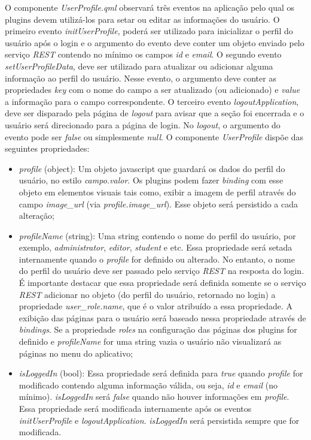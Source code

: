 O componente \textit{UserProfile.qml} observará três eventos na aplicação pelo qual os plugins devem utilizá-los para setar ou editar as informações do usuário. O primeiro evento \textit{initUserProfile}, poderá ser utilizado para inicializar o perfil do usuário após o login e o argumento do evento deve conter um objeto enviado pelo serviço \textit{REST} contendo no mínimo os campos \textit{id} e \textit{email}. O segundo evento \textit{setUserProfileData}, deve ser utilizado para atualizar ou adicionar alguma informação ao perfil do usuário. Nesse evento, o argumento deve conter as propriedades \textit{key} com o nome do campo a ser atualizado (ou adicionado) e \textit{value} a informação para o campo correspondente. O terceiro evento \textit{logoutApplication}, deve ser disparado pela página de \textit{logout} para avisar que a seção foi encerrada e o usuário será direcionado para a página de login. No \textit{logout}, o argumento do evento pode ser \textit{false} ou simplesmente \textit{null}. O componente \textit{UserProfile} dispõe das seguintes propriedades:

\begin{itemize}
	\item \textit{profile} (object): Um objeto javascript que guardará os dados do perfil do usuário, no estilo \textit{campo.valor}. Os plugins podem fazer \textit{binding} com esse objeto em elementos visuais tais como, exibir a imagem de perfil através do campo \textit{image\_url} (via \textit{profile.image\_url}). Esse objeto será persistido a cada alteração;

	\item \textit{profileName} (string): Uma string contendo o nome do perfil do usuário, por exemplo, \textit{administrator}, \textit{editor}, \textit{student} e etc. Essa propriedade será setada internamente quando o \textit{profile} for definido ou alterado. No entanto, o nome do perfil do usuário deve ser passado pelo serviço \textit{REST} na resposta do login. É importante destacar que essa propriedade será definida somente se o serviço \textit{REST} adicionar no objeto (do perfil do usuário, retornado no login) a propriedade \textit{user\_role.name}, que é o valor atribuído a essa propriedade. A exibição das páginas para o usuário será baseado nessa propriedade através de \textit{bindings}. Se a propriedade \textit{roles} na configuração das páginas dos plugins for definido e \textit{profileName} for uma string vazia o usuário não visualizará as páginas no menu do aplicativo;

	\item \textit{isLoggedIn} (bool): Essa propriedade será definida para \textit{true} quando \textit{profile} for modificado contendo alguma informação válida, ou seja, \textit{id} e \textit{email} (no mínimo). \textit{isLoggedIn} será \textit{false} quando não houver informações em \textit{profile}. Essa propriedade será modificada internamente após os eventos \textit{initUserProfile} e \textit{logoutApplication}. \textit{isLoggedIn} será persistida sempre que for modificada.
\end{itemize}

